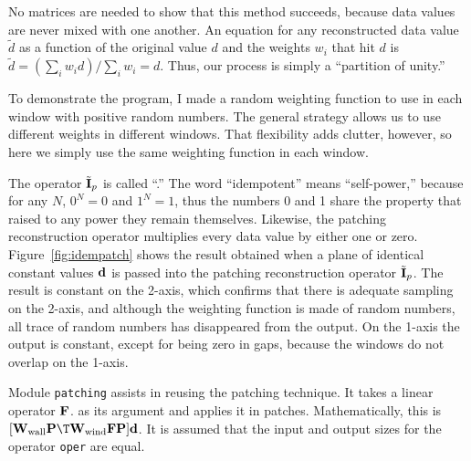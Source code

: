 \par
No matrices are needed to show that this method succeeds,
because data values are never mixed with one another.
An equation for any reconstructed data value $\tilde d$
as a function of the original value $d$ and the weights $w_i$
that hit $d$ is $\tilde d = (\sum_i w_i d) / \sum_i w_i = d$.
Thus, our process is simply a ``partition of unity.''

\par
To demonstrate the program,
I made a random weighting function
to use in each window with positive random numbers.
The general strategy allows us to use different weights in different windows.
That flexibility adds clutter, however,
so here we simply use the same weighting function in each window.


\par
The operator
$\tilde{\bold I}_p$
is called ``.''
The word ``idempotent'' means ``self-power,'' because
for any $N$,  $0^N=0$ and $1^N=1$,
thus the numbers 0 and 1 share the property that raised
to any power they remain themselves.
Likewise, the patching reconstruction operator
multiplies every data value by either one or zero.
Figure~\ref{fig:idempatch} shows the result
obtained when a plane of identical constant values $\bold d$
is passed into the patching reconstruction operator $\tilde{\bold I}_p$.
The result is constant on the 2-axis, which confirms
that
there is adequate sampling on the 2-axis,
and although the weighting function is made of random numbers,
all trace of random numbers has disappeared from the output.
On the 1-axis the output is constant,
except for being zero in gaps,
because the windows do not overlap on the 1-axis.


\par
Module \texttt{patching} assists in reusing the patching technique. It
takes a linear operator $\bold F$.
as its argument and applies it in patches.
Mathematically, this is
$ [\bold W_{\rm wall} \bold P\T \bold W_{\rm wind} \bold F \bold P ] \bold d$.
It is assumed that the input and output sizes for the operator
\texttt{oper} are equal.

